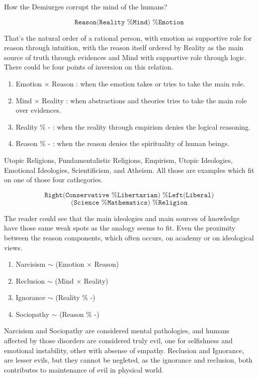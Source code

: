 \documentclass[12pt,a4paper]{article}
\begin{document}
How the Demiurges corrupt the mind of the humans? 

$$ \texttt{Reason(Reality \% Mind) \% Emotion} $$

\vspace{\baselineskip}

That's the natural order of a rational person, with emotion as supportive role for reason through intuition, with the reason itself ordered by Reality as the main source of truth through evidences and Mind with supportive role through logic. There could be four points of inversion on this relation.

\begin{enumerate}
\item Emotion $\times$ Reason : when the emotion takes or tries to take the main role.
\item Mind $\times$ Reality : when abstractions and theories tries to take the main role over evidences.
\item Reality \% - : when the reality through empirism denies the logical reasoning.
\item Reason \% - : when the reason denies the spirituality of human beings.
\end{enumerate}

\vspace{\baselineskip}

Utopic Religions, Fundamentalistic Religions, Empirism, Utopic Ideologies, Emotional Ideologies, Scientificism, and Atheism. All those are examples which fit on one of those four cathegories. 

$$ \texttt{ Right(Conservative \% Libertarian) \% Left(Liberal) } $$
$$ \texttt{ (Science \% Mathematics) \% Religion } $$

The reader could see that the main ideologies and main sources of knowledge have those same weak spots as the analogy seems to fit. Even the proximity between the reason components, which often occurs, on academy or on ideological views.

\begin{enumerate}
\item Narcisism $\sim$ (Emotion $\times$ Reason)
\item Reclusion $\sim$ (Mind $\times$ Reality)
\item Ignorance $\sim$ (Reality \% -)
\item Sociopathy $\sim$ (Reason \% -)
\end{enumerate}

Narcisism and Sociopathy are considered mental pathologies, and humans affected by those disorders are considered truly evil, one for selfishness and emotional instability, other with absense of empathy. Reclusion and Ignorance, are lesser evils, but they cannot be negleted, as the ignorance and reclusion, both contributes to maintenance of evil in physical world. \\
\end{document}
